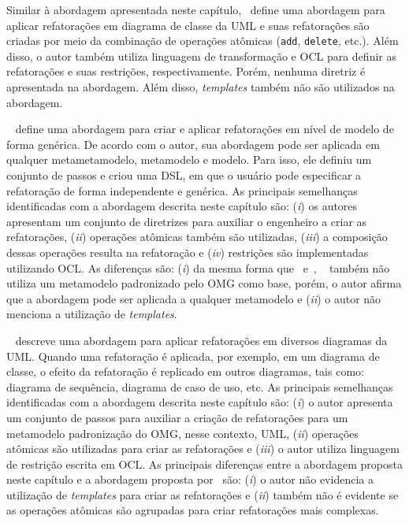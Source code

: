 Similar à abordagem apresentada neste capítulo,~ define uma abordagem para aplicar refatorações em diagrama de classe da UML e suas refatorações são criadas por meio da combinação de operações atômicas (\texttt{add}, \texttt{delete}, etc.). Além disso, o autor também utiliza linguagem de transformação e OCL para definir as refatorações e suas restrições, respectivamente. Porém, nenhuma diretriz é apresentada na abordagem. Além disso, \textit{templates} também não são utilizados na abordagem. 

~ define uma abordagem para criar e aplicar refatorações em nível de modelo de forma genérica. De acordo com o autor, sua abordagem pode ser aplicada em qualquer metametamodelo, metamodelo e modelo. Para isso, ele definiu um conjunto de passos e criou uma DSL, em que o usuário pode especificar a refatoração de forma independente e genérica. As principais semelhanças identificadas com a abordagem descrita neste capítulo são: (\textit{i}) os autores apresentam um conjunto de diretrizes para auxiliar o engenheiro a criar as refatorações, (\textit{ii}) operações atômicas também são utilizadas, (\textit{iii}) a composição dessas operações resulta na refatoração e (\textit{iv}) restrições são implementadas utilizando OCL. As diferenças são: (\textit{i}) da mesma forma que~ e~,  ~ também não utiliza um metamodelo padronizado pelo OMG como base, porém, o autor afirma que a abordagem pode ser aplicada a qualquer metamodelo e (\textit{ii}) o autor não menciona a utilização de \textit{templates}.

~ descreve uma abordagem para aplicar refatorações em diversos diagramas da UML. Quando uma refatoração é aplicada, por exemplo, em um diagrama de classe, o efeito da refatoração é replicado em outros diagramas, tais como: diagrama de sequência, diagrama de caso de uso, etc. As principais semelhanças identificadas com a abordagem descrita neste capítulo são: (\textit{i}) o autor apresenta um conjunto de passos para auxiliar a criação de refatorações para um metamodelo padronização do OMG, nesse contexto, UML, (\textit{ii}) operações atômicas são utilizadas para criar as refatorações e (\textit{iii}) o autor utiliza linguagem de restrição escrita em OCL. As principais diferenças entre a abordagem proposta neste capítulo e a abordagem proposta por~ são: (\textit{i}) o autor não evidencia a utilização de \textit{templates} para criar as refatorações e (\textit{ii}) também não é evidente se as operações atômicas são agrupadas para criar refatorações mais complexas. 

